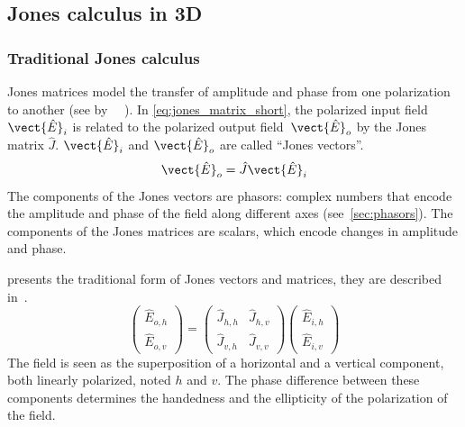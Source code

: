 \subsection{Jones calculus in 3D}

\subsubsection{Traditional Jones calculus}
Jones matrices model the transfer of amplitude and phase from one polarization to another (see  by ~\citeauthor{hecht2002optics}~\cite{hecht2002optics}).
In \cref{eq:jones_matrix_short}, the polarized input field $\vect{\hat{E}}_i$ is related to the polarized output field~$\vect{\hat{E}}_o$ by the Jones matrix $\hat{J}$.
$\vect{\hat{E}}_i$ and $\vect{\hat{E}}_o$ are called ``Jones vectors''.
\begin{equation}
    \vect{\hat{E}}_o = \hat{J} \vect{\hat{E}}_i
    \label{eq:jones_matrix_short}
\end{equation}
The components of the Jones vectors are phasors: complex numbers that encode the amplitude and phase of the field along different axes (see~\cref{sec:phasors}).
The components of the Jones matrices are scalars, which encode changes in amplitude and phase.

 presents the traditional form of Jones vectors and matrices, they are described in~.
\begin{equation}
    \begin{pmatrix}
        \hat{E}_{o, h}\\
        \hat{E}_{o, v}
    \end{pmatrix}
    =
    \begin{pmatrix}
        \hat{J}_{h, h}   &   \hat{J}_{h, v} \\
        \hat{J}_{v, h}   &   \hat{J}_{v, v}
    \end{pmatrix}
    \begin{pmatrix}
        \hat{E}_{i, h}\\
        \hat{E}_{i, v}
    \end{pmatrix}
    \label{eq:jones_matrix_2d}
\end{equation}
The field is seen as the superposition of a horizontal and a vertical component, both linearly polarized, noted $h$ and $v$.
The phase difference between these components determines the handedness and the ellipticity of the polarization of the field.

